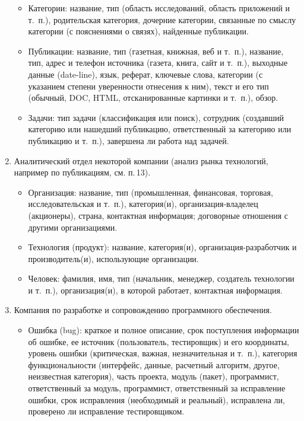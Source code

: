 \documentclass[12pt, openany, twoside]{book} %
\begin{document}
\begin{enumerate}
\begin{itemize}
\item Категории: название, тип (область исследований, область приложений и т.~п.), родительская категория, дочерние категории, связанные по смыслу категории (с пояснениями о связях), найденные публикации.
\item Публикации: название, тип (газетная, книжная, веб и т.~п.), название, тип, адрес и телефон источника (газета, книга, сайт и т.~п.), выходные данные (date-line), язык, реферат, ключевые слова, категории (с указанием степени уверенности отнесения к ним), текст и его тип (обычный, DOC, HTML, отсканированные картинки и т.~п.), обзор.
\item Задачи: тип задачи (классификация или поиск), сотрудник (создавший категорию или нашедший публикацию, ответственный за категорию или публикацию и т.~п.), завершена ли работа над задачей.
\end{itemize}
\item Аналитический отдел некоторой компании (анализ рынка технологий, например по публикациям, см. п.\,{}13).
\begin{itemize}
\item Организация: название, тип (промышленная, финансовая, торговая, исследовательская и т.~п.), категория(и), организация-владелец (акционеры), страна, контактная информация; договорные отношения с другими организациями.
\item Технология (продукт): название, категория(и), организация-разработчик и производитель(и), использующие организации.
\item Человек: фамилия, имя, тип (начальник, менеджер, создатель технологии и т.~п.), организация(и), в которой работает, контактная информация.
\end{itemize}
\item Компания по разработке и сопровождению программного обеспечения.
\begin{itemize}
\item Ошибка (bug): краткое и полное описание, срок поступления информации об ошибке, ее источник (пользователь, тестировщик) и его координаты, уровень ошибки (критическая, важная, незначительная и т.~п.), категория функциональности (интерфейс, данные, расчетный алгоритм, другое, неизвестная категория), часть проекта, модуль (пакет), программист, ответственный за модуль, программист, ответственный за исправление ошибки, срок исправления (необходимый и реальный), исправлена ли, проверено ли исправление тестировщиком.
\end{itemize}
\end{enumerate}
\end{document}
